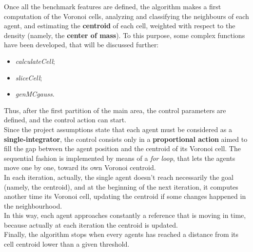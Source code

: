 \documentclass[a4paper,11pt,oneside]{book}
\begin{document}
Once all the benchmark features are defined, the algorithm makes a first computation of the Voronoi cells, analyzing and classifying the neighbours of each agent, and estimating the \textbf{centroid} of each cell, weighted with respect to the density (namely, the \textbf{center of mass}). To this purpose, some complex functions have been developed, that will be discussed further:
\begin{itemize}
	\item \textit{calculateCell};
	\item \textit{sliceCell};
	\item \textit{genMCgauss}.
\end{itemize}
Thus, after the first partition of the main area, the control parameters are defined, and the control action can start.\\
Since the project assumptions state that each agent must be considered as a \textbf{single-integrator}, the control consists only in a \textbf{proportional action} aimed to fill the gap between the agent position and the centroid of its Voronoi cell. The sequential fashion is implemented by means of a \textit{for loop}, that lets the agents move one by one, toward its own Voronoi centroid.\\
In each iteration, actually, the single agent doesn't reach necessarily the goal (namely, the centroid), and at the beginning of the next iteration, it computes another time its Voronoi cell, updating the centroid if some changes happened in the neighbourhood.\\
In this way, each agent approaches constantly a reference that is moving in time, because actually at each iteration the centroid is updated. \\
Finally, the algorithm stops when every agents has reached a distance from its cell centroid lower than a given threshold.\\	
\end{document}

